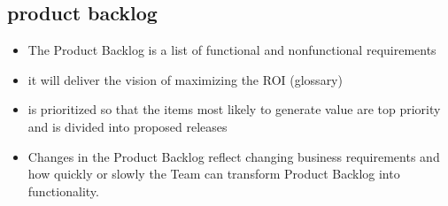 \subsection*{product backlog}
\begin{itemize}
  \item The Product Backlog is a list of functional and nonfunctional requirements
  \item it will deliver the vision of maximizing the ROI (glossary)
  \item is prioritized so that the items most likely to generate value are top priority and is divided into proposed releases
  \item Changes in the Product Backlog reflect changing business requirements and how quickly or slowly the Team can transform Product Backlog into functionality.
\end{itemize}